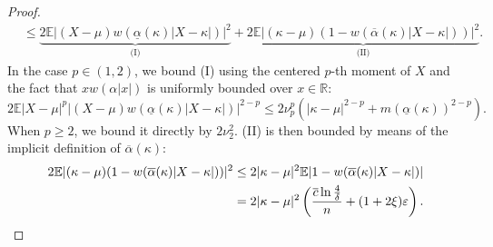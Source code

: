 \documentclass{article}
\theoremstyle{plain}
\theoremstyle{definition}
\def\R{\mathbb{R}} %
\newcommand{\E}{\mathbb{E}} %
\begin{document}
\begin{appendix}
{\begin{proof}
\begin{align*}
			                    & \leq
                          \underbrace{2\E\lvert  (X-\mu)w(\underline{\alpha}(\kappa) |X-\kappa|)\rvert ^2}_{\text{(I)}}
			+
      \underbrace{2\E\lvert  (\kappa-\mu)(1-w(\overline{\alpha}(\kappa) |X-\kappa|))\rvert ^2}_{\text{(II)}}.
		\end{align*}
		In the case \( p\in (1,2)\), we bound (I) using the centered \( p \)-th moment of \( X \) and the fact that \( xw (\alpha \lvert x \rvert ) \) is uniformly bounded over \( x\in \R \): \[
      2\E\lvert X-\mu \rvert^p \lvert  (X-\mu)w(\underline{\alpha}(\kappa) |X-\kappa|)\rvert ^{2-p} \le 2\nu_p^p\left(\lvert \kappa -\mu  \rvert  ^{2-p} + m(\underline{\alpha }(\kappa ))^{2-p}\right).
		\]
		When \( p\ge 2 \), we bound it directly by \( 2\nu_2^2 \).
		(II) is then bounded by means of the implicit definition of \( \overline{\alpha }(\kappa ) \):
    \begin{align*}
      2\E\lvert  (\kappa-\mu)(1-w(\overline{\alpha}(\kappa) |X-\kappa|))\rvert ^2  &\le 2\lvert \kappa -\mu  \rvert^2  \mathbb{E}\lvert 1-w (\overline{\alpha }(\kappa )\lvert X-\kappa \rvert ) \rvert \\
 &= 2 \lvert \kappa -\mu  \rvert^2 \left(\frac{\overline{c} \ln \frac{4}{\delta }}{n}+(1+2\xi )\varepsilon\right).\qedhere
    \end{align*}
	\end{proof}}




\end{appendix}
\end{document}
